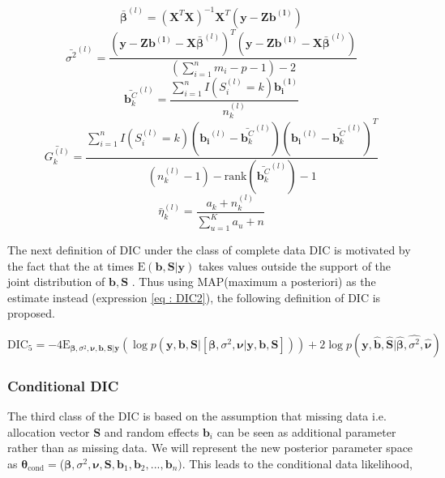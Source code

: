 $$\boldsymbol{\bar{\beta}}^{(l)} = (\boldsymbol{X}^T\boldsymbol{X})^{-1}\boldsymbol{X}^T(\boldsymbol{y}-\boldsymbol{Zb^{(l)}})$$
$$\bar{\sigma^2}^{(l)} = \frac {(\boldsymbol{y}-\boldsymbol{Zb^{(l)}}-\boldsymbol{X}\boldsymbol{\bar{\beta}}^{(l)})^T (\boldsymbol{y}-\boldsymbol{Zb^{(l)}}-\boldsymbol{X}\boldsymbol{\bar{\beta}}^{(l)})} {(\sum_{i=1}^n m_i - p - 1) -2}$$
$$\bar{\boldsymbol{b}_k^C}^{(l)} = \frac {\sum_{i=1}^n I(S_i^{(l)}=k) \boldsymbol{b_i^{(l)}}} {n_k^{(l)}}$$
$$\bar{G_k^{(l)}} = \frac {\sum_{i=1}^n I(S_i^{(l)}=k) (\boldsymbol{b_i}^{(l)}-\bar{\boldsymbol{b}_k^C}^{(l)})(\boldsymbol{b_i}^{(l)}-\bar{\boldsymbol{b}_k^C}^{(l)})^T} 
{(n_k^{(l)} - 1) - \text{rank}(\bar{\boldsymbol{b}_k^C}^{(l)}) - 1}$$
$$\bar{\eta}_k^{(l)} = \frac {a_k + n_k^{(l)}} {\sum_{u=1}^K a_u + n}$$

The next definition of DIC under the class of complete data DIC is motivated by the fact that the at times $\text{E}(\boldsymbol{b}, \boldsymbol{S}|\boldsymbol{y})$ takes values outside the support of the joint distribution of $\boldsymbol{b}, \boldsymbol{S}$ \citep{celeux_deviance_2006}. Thus using MAP(maximum a posteriori) as the estimate instead (expression \ref{eq : DIC2}), the following definition of DIC is proposed.

\begin{equation}
\label{eq : DIC5}
\text{DIC}_5 = -4\text{E}_{\boldsymbol{\beta}, \sigma^2, \boldsymbol{\nu},\boldsymbol{b}, \boldsymbol{S}|\boldsymbol{y}}(\log{p(\boldsymbol{y}, \boldsymbol{b}, \boldsymbol{S}|[\boldsymbol{\beta}, \sigma^2, \boldsymbol{\nu}|\boldsymbol{y}, \boldsymbol{b}, \boldsymbol{S}])}) + 
2\log{p(\boldsymbol{y}, \boldsymbol{\hat{b}}, \boldsymbol{\hat{S}}|\boldsymbol{\hat{\beta}}, \hat{\sigma^2}, \boldsymbol{\hat{\nu}})}
\end{equation}

\subsubsection{Conditional DIC}
The third class of the DIC is based on the assumption that missing data i.e. allocation vector $\boldsymbol{S}$ and random effects $\boldsymbol{b}_i$ can be seen as additional parameter rather than as missing data. We will represent the new posterior parameter space as $\boldsymbol{\theta}_\text{cond} = $($\boldsymbol{\beta}, \sigma^2, \boldsymbol{\nu}, \boldsymbol{S}, \boldsymbol{b}_1, \boldsymbol{b}_2, ..., \boldsymbol{b}_n)$. This leads to the conditional data likelihood,

